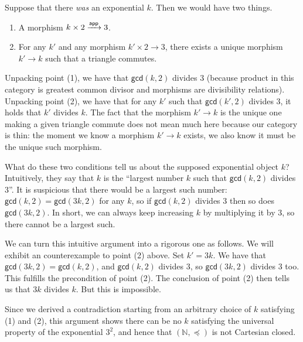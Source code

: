 Suppose that there \emph{was} an exponential \(k\).
Then we would have two things.
\begin{enumerate}
\item A morphism \(k \times 2 \xrightarrow{\mathsf{app}} 3\).
\item For any \(k'\)
and any morphism \(k' \times 2 \to 3\),
there exists a unique morphism \(k' \to k\) such that
a triangle commutes.
\end{enumerate}
Unpacking point (1),
we have that \(\mathsf{gcd}(k,2)\) divides \(3\) (because product in this
category is greatest common divisor and morphisms are divisibility relations).
Unpacking point (2), we have that for any \(k'\) such that \(\mathsf{gcd}(k',2)\) divides \(3\),
it holds that \(k'\) divides \(k\). The fact that the morphism \(k' \to k\)
is the unique one making a given triangle commute does not mean much here because our category
is thin: the moment we know a morphism \(k' \to k\) exists, we also know it must be the unique
such morphism.

What do these two conditions tell us about the supposed exponential object \(k\)?
Intuitively, they say that \(k\) is the ``largest number \(k\) such that \(\mathsf{gcd}(k,2)\) divides \(3\)''.
It is suspicious that there would be a largest such number: \(\mathsf{gcd}(k,2) = \mathsf{gcd}(3k,2)\)
for any \(k\), so if \(\mathsf{gcd}(k,2)\) divides \(3\) then so does \(\mathsf{gcd}(3k,2)\).
In short, we can always keep increasing \(k\) by multiplying it by \(3\), so there cannot be a largest such.

We can turn this intuitive argument into a rigorous one as follows.
We will exhibit an counterexample to point (2) above. Set \(k' = 3k\).
We have that \(\mathsf{gcd}(3k,2) = \mathsf{gcd}(k,2)\), and \(\mathsf{gcd}(k,2)\) divides \(3\),
so \(\mathsf{gcd}(3k,2)\) divides \(3\) too. This fulfills the precondition of point (2).
The conclusion of point (2) then tells us that
\(3k\) divides \(k\). But this is impossible.

Since we derived a contradiction starting from an arbitrary choice of \(k\) satisfying (1) and (2),
this argument shows
there can be no \(k\) satisfying the universal property of the exponential \(3^2\),
and hence that
$(\mathbb{N}, \preceq)$ is not Cartesian closed.

